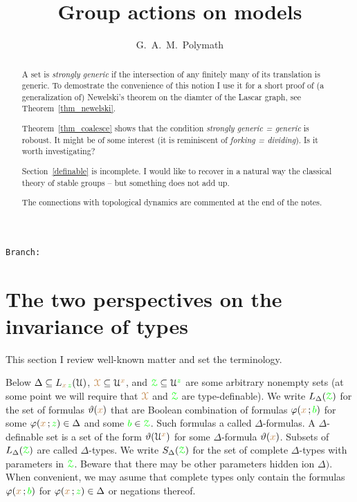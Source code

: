 \documentclass[10pt,openany]{amsproc}
\def\X{\EuScript X}
\def\Z{\EuScript Z}
\def\U{\EuScript U}
\def\theta{\vartheta}
\def\phi{\varphi}
\newcounter{thm}
\theoremstyle{mio}
\def\mr{\color{brown}}
\def\gr{\color{green}}
\def\mrX{{\mr\X}}
\def\grZ{{\gr\Z}}
\newcommand\branch{}
\begin{document}
\author{G.\ A.\ M.\ Polymath}
\title{Group actions on models}
\hfill\texttt{Branch:\ \branch\ \DTMnow}
\maketitle
\raggedbottom
\begin{abstract}
  \setlength{\parindent}{0ex}
  \setlength{\parskip}{.4\baselineskip}
  A set is \textit{strongly generic\/} if the intersection of any finitely many of its translation is generic.
  To demostrate the convenience of this notion I use it for a short proof of (a generalization of) Newelski's theorem on the diamter of the Lascar graph, see Theorem~\ref{thm_newelski}.

  Theorem~\ref{thm_coalesce} shows that the condition \textit{strongly generic = generic\/} is roboust.
  It might be of some interest (it is reminiscent of \textit{forking = dividing\/}).
  Is it worth investigating?

  Section~\ref{definable} is incomplete.
  I would like to recover in a natural way the classical theory of stable groups -- but something does not add up.
  
  The connections with topological dynamics are commented at the end of the notes.
\end{abstract}

\def\medrel#1{\parbox[t]{5ex}{$\displaystyle\hfil #1$}}
\def\ceq#1#2#3{\parbox[t]{17ex}{$\displaystyle #1$}\medrel{#2}{$\displaystyle #3$}}

\section{The two perspectives on the invariance of types}

This section I review well-known matter and set the terminology.

Below $\Delta\subseteq L_{{\mr x}\,{\gr z}}(\U)$, ${\mrX}\subseteq\U^{\mr x}$, and ${\grZ}\subseteq\U^{\gr z}$ are some arbitrary nonempty sets (at some point we will require that $\mrX$ and $\grZ$ are type-definable).
We write $L_\Delta({\grZ})$ for the set of formulas $\theta({\mr x})$ that are Boolean combination of formulas $\phi({\mr x}\,;{\gr b})$ for some $\phi({\mr x}\,;{\gr z})\in\Delta$ and some ${\gr b}\in{\grZ}$.
Such formulas a called $\Delta$-formulas.
A $\Delta$-definable set is a set of the form $\theta(\U^{\mr x})$ for some $\Delta$-formula $\theta({\mr x})$.
Subsets of $L_\Delta({\grZ})$ are called $\Delta$-types.
We write $S_\Delta({\grZ})$ for the set of complete $\Delta$-types with parameters in $\grZ$. Beware that there may be other parameters hidden ion $\Delta)$.
When convenient, we may asume that complete types only contain the formulas $\phi({\mr x}\,;{\gr b})$ for $\phi({\mr x}\,;{\gr z})\in\Delta$ or negations thereof.
\end{document}
